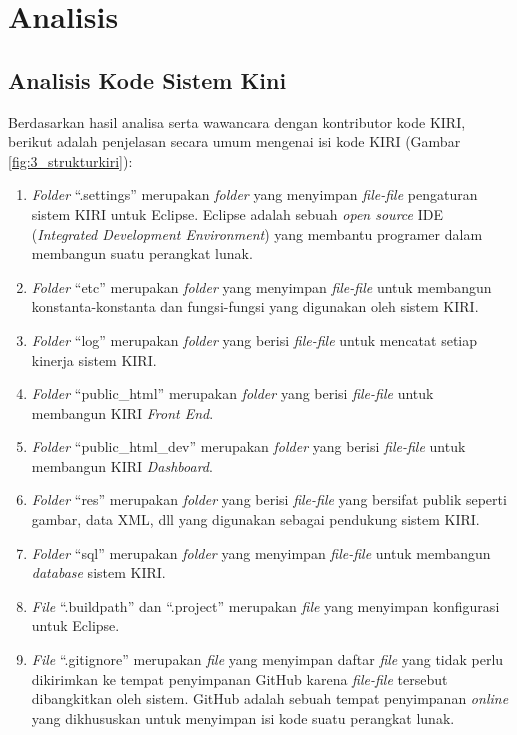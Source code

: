 \chapter{Analisis}
\label{chap:analisis}

\section{Analisis Kode Sistem Kini}
\label{sec:analisissistemkini}
Berdasarkan hasil analisa serta wawancara dengan kontributor kode KIRI, berikut adalah penjelasan secara umum mengenai isi kode KIRI (Gambar \ref{fig:3_strukturkiri}):
\begin{enumerate}
	\item \textit{Folder} ``.settings'' merupakan \textit{folder} yang menyimpan \textit{file-file} pengaturan sistem KIRI untuk Eclipse. Eclipse adalah sebuah \textit{open source} IDE (\textit{Integrated Development Environment}) yang membantu programer dalam membangun suatu perangkat lunak\cite{eclipse}.
	\item \textit{Folder} ``etc'' merupakan \textit{folder} yang menyimpan \textit{file-file} untuk membangun konstanta-konstanta dan fungsi-fungsi yang digunakan oleh sistem KIRI.
	\item \textit{Folder} ``log'' merupakan \textit{folder} yang berisi \textit{file-file} untuk mencatat setiap kinerja sistem KIRI.
	\item \textit{Folder} ``public\_html'' merupakan \textit{folder} yang berisi \textit{file-file} untuk membangun KIRI \textit{Front End}.
	\item \textit{Folder} ``public\_html\_dev'' merupakan \textit{folder} yang berisi \textit{file-file} untuk membangun KIRI \textit{Dashboard}.
	\item \textit{Folder} ``res'' merupakan \textit{folder} yang berisi \textit{file-file} yang bersifat publik seperti gambar, data XML, dll yang digunakan sebagai pendukung sistem KIRI.
	\item \textit{Folder} ``sql'' merupakan \textit{folder} yang menyimpan \textit{file-file} untuk membangun \textit{database} sistem KIRI.
	\item \textit{File} ``.buildpath'' dan ``.project'' merupakan \textit{file} yang menyimpan konfigurasi untuk Eclipse.
	\item \textit{File} ``.gitignore'' merupakan \textit{file} yang menyimpan daftar \textit{file} yang tidak perlu dikirimkan ke tempat penyimpanan GitHub karena \textit{file-file} tersebut dibangkitkan oleh sistem. GitHub adalah sebuah tempat penyimpanan \textit{online} yang dikhususkan untuk menyimpan isi kode suatu perangkat lunak\cite{github}.

\end{enumerate}
